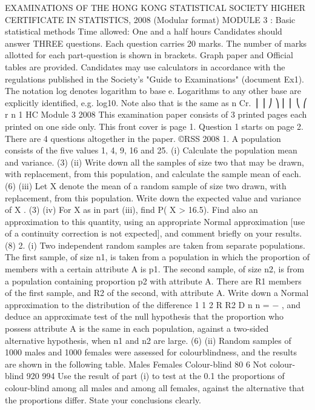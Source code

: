 EXAMINATIONS OF THE HONG KONG STATISTICAL SOCIETY
HIGHER CERTIFICATE IN STATISTICS, 2008
(Modular format)
MODULE 3 : Basic statistical methods
Time allowed: One and a half hours
Candidates should answer THREE questions.
Each question carries 20 marks.
The number of marks allotted for each part-question is shown in brackets.
Graph paper and Official tables are provided.
Candidates may use calculators in accordance with the regulations published in
the Society's "Guide to Examinations" (document Ex1).
The notation log denotes logarithm to base e.
Logarithms to any other base are explicitly identified, e.g. log10.
Note also that is the same as n
Cr. ⎟
⎟
⎠
⎞
⎜
⎜
⎝
⎛
r
n
 1 HC Module 3 2008
This examination paper consists of 3 printed pages each printed on one side only.
This front cover is page 1.
Question 1 starts on page 2.
There are 4 questions altogether in the paper.
©RSS 2008 
1. A population consists of the five values 1, 4, 9, 16 and 25.
(i) Calculate the population mean and variance. (3)
(ii) Write down all the samples of size two that may be drawn, with replacement,
from this population, and calculate the sample mean of each. (6)
(iii) Let X denote the mean of a random sample of size two drawn, with
replacement, from this population. Write down the expected value and
variance of X . (3)
(iv) For X as in part (iii), find P( X > 16.5). Find also an approximation to this
quantity, using an appropriate Normal approximation [use of a continuity
correction is not expected], and comment briefly on your results. (8)
2. (i) Two independent random samples are taken from separate populations. The
first sample, of size n1, is taken from a population in which the proportion of
members with a certain attribute A is p1. The second sample, of size n2, is
from a population containing proportion p2 with attribute A. There are R1
members of the first sample, and R2 of the second, with attribute A.
Write down a Normal approximation to the distribution of the difference
1
1 2
R R2 D
n n = − , and deduce an approximate test of the null hypothesis that the
proportion who possess attribute A is the same in each population, against a
two-sided alternative hypothesis, when n1 and n2 are large.
(6)
(ii) Random samples of 1000 males and 1000 females were assessed for colourblindness,
and the results are shown in the following table.
Males Females
Colour-blind 80 6
Not colour-blind 920 994
Use the result of part (i) to test at the 0.1%
the proportions of colour-blind among all males and among all females, against
the alternative that the proportions differ. State your conclusions clearly.
